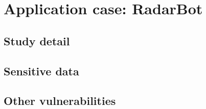 \section{Application case: RadarBot}
	\subsection{Study detail}
	\subsection{Sensitive data}
	\subsection{Other vulnerabilities}
